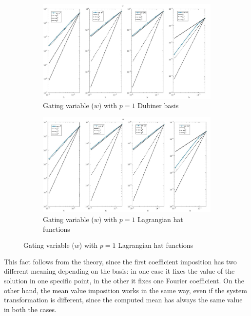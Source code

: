\documentclass[a4paper,11pt]{article}
\begin{document}
\begin{figure}[H] 
	\caption{Comparison of the gating variable ($w$)}
	\label{w_1_mean}
	\begin{subfigure}{\textwidth}
		\begin{center}
			\includegraphics[width = \textwidth]{./errors/D1_w_2.jpg}
			\caption{Gating variable ($w$) with $p=1$ Dubiner basis}
		\end{center}
	\end{subfigure}
	\begin{subfigure}{\textwidth}
		\begin{center}
			\includegraphics[width =\textwidth]{./errors/P1_w_2.jpg}
			\caption{Gating variable ($w$) with $p=1$ Lagrangian hat functions}
		\end{center}
	\end{subfigure}
\end{figure}

\noindent This fact follows from the theory, since the first coefficient imposition has two different meaning depending on the basis: in one case it fixes the value of the solution in one specific point, in the other it fixes one Fourier coefficient. On the other hand, the mean value imposition works in the same way, even if the system transformation is different, since the computed mean has always the same value in both the cases.
\restoregeometry
\newpage
\end{document}
